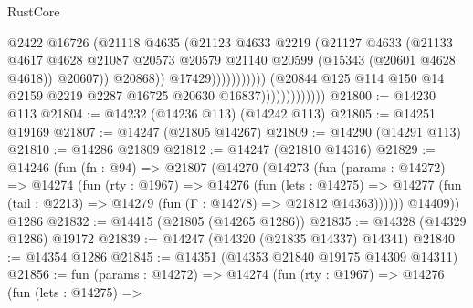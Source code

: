\begin{lexlean}{RustCore}
\begin{coremodule}
                                                  @2422
                                                  @16726
                                                  (@21118
                                                    @4635
                                                    (@21123
                                                      @4633
                                                      @2219
                                                      (@21127
                                                        @4633
                                                        (@21133
                                                          @4617
                                                          @4628
                                                          @21087
                                                          @20573
                                                          @20579
                                                          @21140
                                                          @20599
                                                          (@15343 (@20601 @4628 @4618))
                                                          @20607))
                                                      @20868))
                                                  @17429)))))))))))
                            (@20844
                              @125
                              @114
                              @150
                              @14
                              @2159
                              @2219
                              @2287
                              @16725
                              @20630
                              @16837)))))))))))))
@21800 := @14230 @113
@21804 := @14232 (@14236 @113) (@14242 @113)
@21805 := @14251 @19169
@21807 := @14247 (@21805 @14267)
@21809 := @14290 (@14291 @113)
@21810 := @14286 @21809
@21812 := @14247 (@21810 @14316)
@21829 := @14246
    (fun (fn : @94) =>
    @21807
      (@14270
        (@14273
          (fun (params : @14272) =>
          @14274
            (fun (rty : @1967) =>
            @14276
              (fun (lets : @14275) =>
              @14277 (fun (tail : @2213) => @14279 (fun (Γ : @14278) => @21812 @14363))))))
        @14409))
    @1286
@21832 := @14415 (@21805 (@14265 @1286))
@21835 := @14328 (@14329 @1286) @19172
@21839 := @14247 (@14320 (@21835 @14337) @14341)
@21840 := @14354 @1286
@21845 := @14351 (@14353 @21840 @19175 @14309 @14311)
@21856 := fun (params : @14272) =>
  @14274
    (fun (rty : @1967) =>
    @14276
      (fun (lets : @14275) =>

\end{coremodule}
\end{lexlean}
